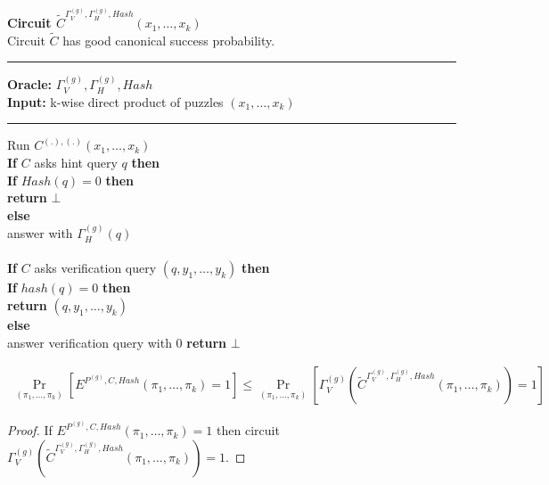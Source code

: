 \begin{codeblock}
  \textbf{Circuit $\widetilde{C}^{\Gamma_V^{(g)}, \Gamma_H^{(g)}, Hash} (x_1, \dots, x_k)$} \\
  Circuit $\widetilde{C}$ has good canonical success probability.
  \medskip

  \hrule

  \medskip

  \textbf{Oracle:} $\Gamma_V^{(g)}, \Gamma_H^{(g)}, Hash$ \\
  \textbf{Input:} k-wise direct product of puzzles $(x_1, \dots, x_k)$ \\

  \medskip\hrule\medskip
  Run $C^{(.), (.)}(x_1, \dots, x_k)$ \\
  \IndI \textbf{If} $C$ asks hint query $q$ \textbf{then}\\
  \IndII \textbf{If} $Hash(q) = 0$ \textbf{then}\\
  \IndIII \textbf{return} $\bot$\\
  \IndII \textbf{else}\\
  \IndIII answer with $\Gamma_H^{(g)}(q)$\\
  \\
  \IndI \textbf{If} $C$ asks verification query $(q, y_1, \dots, y_k)$ \textbf{then} \\
  \IndII \textbf{If} $hash(q) = 0$ \textbf{then} \\
  \IndIII \textbf{return} $(q, y_1, \dots, y_k)$ \\
  \IndII \textbf{else} \\
  \IndIII answer verification query with 0
  \textbf{return} $\bot$
\end{codeblock}


\begin{lemma}
  \begin{align*}
  \underset{(\pi_1, \dots, \pi_k)}{\Pr}[E^{P^{(g)}, C, Hash}(\pi_1, \dots, \pi_k) = 1] \leq \underset{(\pi_1, \dots, \pi_k)}{\Pr}[\Gamma_V^{(g)} (\widetilde{C}^{\Gamma_V^{(g)}, \Gamma_H^{(g)}, Hash}(\pi_1, \dots, \pi_k)) = 1]
  \end{align*}
\end{lemma}

\begin{proof}
If $E^{P^{(g)}, C, Hash}(\pi_1, \dots, \pi_k) = 1$ then circuit $\Gamma_V^{(g)} (\widetilde{C}^{\Gamma_V^{(g)}, \Gamma_H^{(g)}, Hash}(\pi_1, \dots, \pi_k)) = 1$.
\end{proof}

